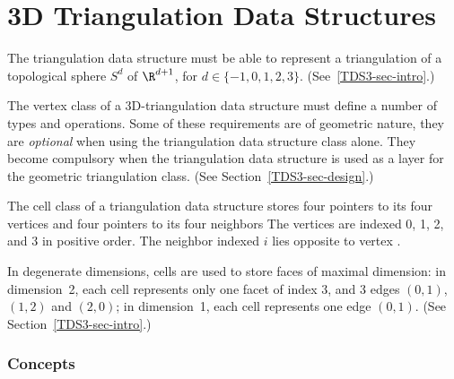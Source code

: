 \chapter{3D Triangulation Data Structures}

The triangulation data structure must be able to represent a
triangulation of a topological sphere $S^d$ of $\R^{d+1}$, for 
$d \in \{-1,0,1,2,3\}$. (See~\ref{TDS3-sec-intro}.)

The vertex class of a 3D-triangulation data structure must define
a number of types and operations. Some of these
requirements are of geometric nature, they are \textit{optional}
when using the triangulation data structure class alone. They become
compulsory when the triangulation data structure is used as a layer
for the geometric triangulation class. (See Section~\ref{TDS3-sec-design}.)

The cell class of a triangulation data structure stores
four pointers to its four vertices and four pointers to its four
neighbors The vertices are indexed 0, 1, 2, and 3 in positive order.
The neighbor indexed $i$ lies opposite to vertex .

In degenerate dimensions, cells are used to store faces of maximal
dimension: in dimension~2, each cell represents only one
facet of index 3, and 3 edges $(0,1)$, $(1,2)$ and $(2,0)$; in
dimension~1, each cell represents one edge $(0,1)$. (See 
Section~\ref{TDS3-sec-intro}.) 

\subsection*{Concepts}


